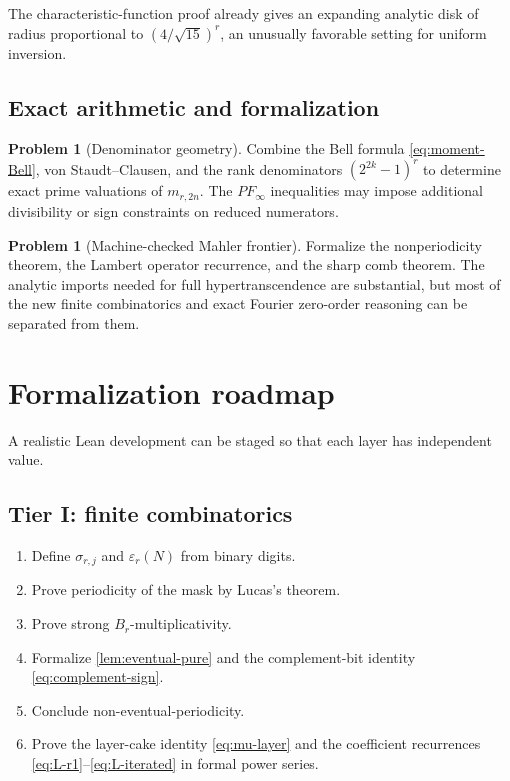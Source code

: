 \documentclass[11pt,oneside]{article}
\theoremstyle{definition}
\newtheorem{problem}[theorem]{Problem}
\theoremstyle{remark}
\begin{document}
The characteristic-function proof already gives an expanding analytic disk
of radius proportional to $(4/\sqrt{15})^r$, an unusually favorable setting
for uniform inversion.

\subsection{Exact arithmetic and formalization}

\begin{problem}[Denominator geometry]
Combine the Bell formula \eqref{eq:moment-Bell}, von Staudt--Clausen, and the
rank denominators $(2^{2k}-1)^r$ to determine exact prime valuations of
$m_{r,2n}$.  The $PF_\infty$ inequalities may impose additional divisibility
or sign constraints on reduced numerators.
\end{problem}

\begin{problem}[Machine-checked Mahler frontier]
Formalize the nonperiodicity theorem, the Lambert operator recurrence, and the
sharp comb theorem.  The analytic imports needed for full hypertranscendence
are substantial, but most of the new finite combinatorics and exact Fourier
zero-order reasoning can be separated from them.
\end{problem}

\section{Formalization roadmap}

A realistic Lean development can be staged so that each layer has independent
value.

\subsection{Tier I: finite combinatorics}

\begin{enumerate}
\item Define $\sigma_{r,j}$ and $\varepsilon_r(N)$ from binary digits.
\item Prove periodicity of the mask by Lucas's theorem.
\item Prove strong $B_r$-multiplicativity.
\item Formalize \cref{lem:eventual-pure} and the complement-bit identity
\eqref{eq:complement-sign}.
\item Conclude non-eventual-periodicity.
\item Prove the layer-cake identity \eqref{eq:mu-layer} and the coefficient
recurrences \eqref{eq:L-r1}--\eqref{eq:L-iterated} in formal power series.
\end{enumerate}
\end{document}

